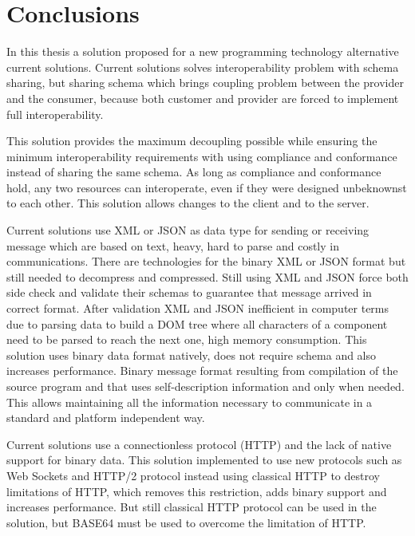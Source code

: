 
\chapter{Conclusions}
\label{chapter:conclusions}

In this thesis a solution proposed for a new programming technology alternative current solutions. Current solutions solves interoperability problem with schema sharing, but sharing schema which brings coupling problem between the provider and the consumer, because both customer and provider are forced to implement full interoperability.

This solution provides the maximum decoupling possible while ensuring the minimum interoperability requirements with using compliance and conformance instead of sharing the same schema. As long as compliance and conformance hold, any two resources can interoperate, even if they were designed unbeknownst to each other. This solution allows changes to the client and to the server.

Current solutions use XML or JSON as data type for sending or receiving message which are based on text, heavy, hard to parse and costly in communications. There are technologies for the binary XML or JSON format but still needed to decompress and compressed. Still using XML and JSON force both side check and validate their schemas to guarantee
that message arrived in correct format. After validation XML and JSON inefficient in computer terms due to parsing data to build a DOM tree where all characters of a component need to be parsed to reach the next one, high memory consumption. This solution uses binary data format natively, does not require schema and also increases performance. Binary message format resulting from compilation of the source program and that uses self-description information and only when needed. This allows  maintaining all the information necessary to communicate in a standard and platform independent way.

Current solutions use a connectionless protocol (HTTP) and the lack of native support for binary data. This solution implemented to use new protocols such as Web Sockets and HTTP/2 protocol instead using classical HTTP to destroy limitations of HTTP, which removes this restriction, adds binary support and increases performance. But still classical HTTP protocol can be used in the solution, but BASE64 must be used to overcome the limitation of HTTP.

